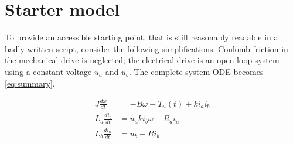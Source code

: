 \documentclass{article}
\begin{document}
\section{Starter model}
\label{sec:starter}
To provide an accessible starting point, that is still reasonably readable in a badly written script, consider the following simplifications: Coulomb friction in the mechanical drive is neglected; the electrical drive is an open loop system using a constant voltage $u_a$ and $u_b$.
The complete system ODE becomes \cref{eq:summary}.

\begin{subequations}
  \label{eq:summary}
  \begin{align}
    J\frac{d\omega}{dt} &= -B\omega - T_u(t) + k i_a i_b  \\
    L_a\frac{di_a}{dt} &= u_a ki_b\omega - R_a i_a \\
    L_b\frac{di_b}{dt} &= u_b - Ri_b
  \end{align}
\end{subequations}
\end{document}
